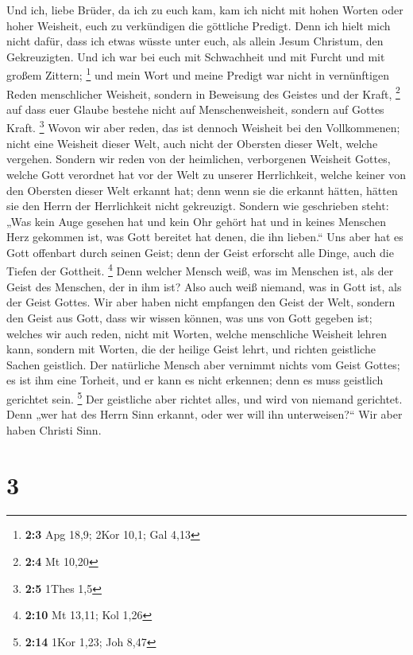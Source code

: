  Und ich, liebe Brüder, da ich zu euch kam, kam ich nicht
mit hohen Worten oder hoher Weisheit, euch zu verkündigen die göttliche
Predigt.  Denn ich hielt mich nicht dafür, dass ich etwas
wüsste unter euch, als allein Jesum Christum, den Gekreuzigten.
 Und ich war bei euch mit Schwachheit und mit Furcht und
mit großem Zittern; \footnote{\textbf{2:3} Apg 18,9; 2Kor 10,1; Gal 4,13}
 und mein Wort und meine Predigt war nicht in vernünftigen
Reden menschlicher Weisheit, sondern in Beweisung des Geistes und der
Kraft, \footnote{\textbf{2:4} Mt 10,20}  auf dass euer
Glaube bestehe nicht auf Menschenweisheit, sondern auf Gottes Kraft.
\footnote{\textbf{2:5} 1Thes 1,5}  Wovon wir aber reden,
das ist dennoch Weisheit bei den Vollkommenen; nicht eine Weisheit
dieser Welt, auch nicht der Obersten dieser Welt, welche vergehen.
 Sondern wir reden von der heimlichen, verborgenen
Weisheit Gottes, welche Gott verordnet hat vor der Welt zu unserer
Herrlichkeit,  welche keiner von den Obersten dieser Welt
erkannt hat; denn wenn sie die erkannt hätten, hätten sie den Herrn der
Herrlichkeit nicht gekreuzigt.  Sondern wie geschrieben
steht: „Was kein Auge gesehen hat und kein Ohr gehört hat und in keines
Menschen Herz gekommen ist, was Gott bereitet hat denen, die ihn
lieben.``  Uns aber hat es Gott offenbart durch seinen
Geist; denn der Geist erforscht alle Dinge, auch die Tiefen der
Gottheit. \footnote{\textbf{2:10} Mt 13,11; Kol 1,26} 
Denn welcher Mensch weiß, was im Menschen ist, als der Geist des
Menschen, der in ihm ist? Also auch weiß niemand, was in Gott ist, als
der Geist Gottes.  Wir aber haben nicht empfangen den
Geist der Welt, sondern den Geist aus Gott, dass wir wissen können, was
uns von Gott gegeben ist;  welches wir auch reden, nicht
mit Worten, welche menschliche Weisheit lehren kann, sondern mit Worten,
die der heilige Geist lehrt, und richten geistliche Sachen geistlich.
 Der natürliche Mensch aber vernimmt nichts vom Geist
Gottes; es ist ihm eine Torheit, und er kann es nicht erkennen; denn es
muss geistlich gerichtet sein. \footnote{\textbf{2:14} 1Kor 1,23; Joh
  8,47}  Der geistliche aber richtet alles, und wird von
niemand gerichtet.  Denn „wer hat des Herrn Sinn erkannt,
oder wer will ihn unterweisen?{}`` Wir aber haben Christi Sinn.

\hypertarget{section-2}{%
\section{3}\label{section-2}}

